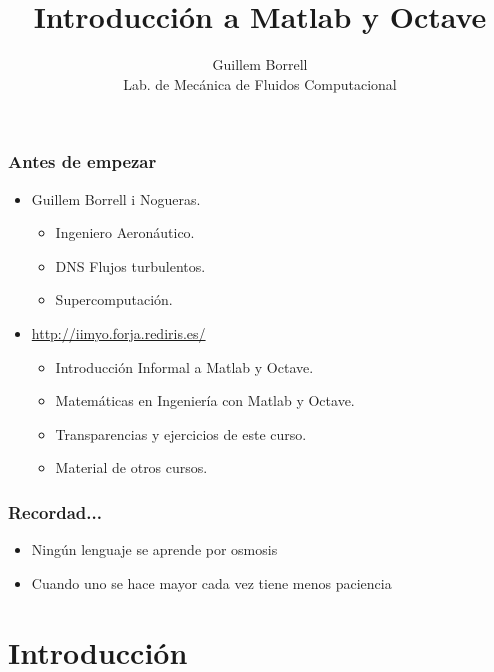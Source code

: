 \documentclass[12pt]{beamer}
\title{Introducción a Matlab y Octave}
\author{Guillem Borrell\\
Lab. de Mecánica de Fluidos Computacional}
\begin{document}

\begin{frame}
  \titlepage
\end{frame}

\begin{frame}
  \frametitle{Antes de empezar}
  \begin{itemize}
  \item Guillem Borrell i Nogueras.
    \begin{itemize}
    \item Ingeniero Aeronáutico.
    \item DNS Flujos turbulentos.
    \item Supercomputación.
    \end{itemize}
  \item  \url{http://iimyo.forja.rediris.es/}
    \begin{itemize}
      \item Introducción Informal a Matlab y Octave.
      \item Matemáticas en Ingeniería con Matlab y Octave.
      \item Transparencias y ejercicios de este curso.
      \item Material de otros cursos.
    \end{itemize}
  \end{itemize}
\end{frame}


\begin{frame}
\frametitle{Recordad...}
\begin{itemize}
\item Ningún lenguaje se aprende por osmosis \pause
\item Cuando uno se hace mayor cada vez tiene menos paciencia \pause
\end{itemize}


\end{frame}


\begin{frame}
  \tableofcontents[pausesections]
\end{frame}

\section{Introducción}
\end{document}
